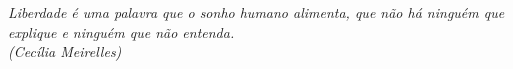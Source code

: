 \begin{epigrafe}
    \vspace*{\fill}
    \begin{flushright}
		\textit{
            Liberdade é uma palavra que o sonho humano alimenta, que não há
            ninguém que explique e ninguém que não entenda. \\
            (Cecília Meirelles)
        }
    \end{flushright}
\end{epigrafe}
